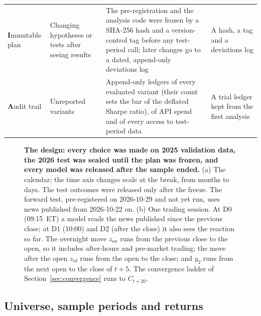 \begin{table}[tbp]
\begin{tabular}{@{}>{\raggedright\arraybackslash}p{1.0in}>{\raggedright\arraybackslash}p{1.4in}%
>{\raggedright\arraybackslash}p{2.6in}>{\raggedright\arraybackslash}p{1.1in}@{}}
\addlinespace
\textbf{I}mmutable plan & Changing hypotheses or tests after seeing results & The pre-registration and the analysis
code were frozen by a SHA-256 hash and a version-control tag before any test-period call; later changes go to a
dated, append-only deviations log & A hash, a tag and a deviations log \\
\addlinespace
\textbf{A}udit trail & Unreported variants & Append-only ledgers of every evaluated variant (their count sets the
bar of the deflated Sharpe ratio), of API spend and of every access to test-period data & A trial ledger kept from
the first analysis \\
\bottomrule
\end{tabular}
\end{table}

\begin{figure}[tbp]
\centering

\caption{\textbf{The design: every choice was made on 2025 validation data, the 2026 test was sealed until the
plan was frozen, and every model was released after the sample ended.} (a) The calendar; the time axis changes
scale at the break, from months to days. The test outcomes were released only after the freeze. The forward
test, pre-registered on 2026-10-29 and not yet run, uses news published from 2026-10-22 on. (b) One trading
session. At D0 (09:15~ET) a
model reads the news published since the previous close; at D1 (10:00) and D2 (after the close) it also sees the
reaction so far. The overnight move $z_{on}$ runs from the previous close to the open, so it includes after-hours
and pre-market trading; the move after the open $z_{id}$ runs from the open to the close; and $y_2$ runs from the
next open to the close of $t+5$. The convergence ladder of Section~\ref{sec:convergence} runs to
$C_{t+20}$.}\label{fig:design}
\end{figure}

\subsection{Universe, sample periods and returns}\label{sec:universe}

